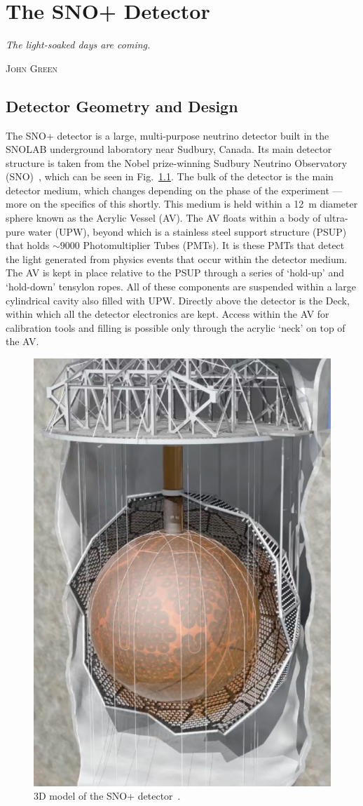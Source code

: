
\chapter{The SNO+ Detector}\label{chap:detector}
\epigraph{\textit{The light-soaked days are coming.}}{\textsc{John Green}}
\section{Detector Geometry and Design}
The SNO+ detector is a large, multi-purpose neutrino detector built in the SNOLAB underground laboratory near Sudbury, Canada. Its main detector structure is taken from the Nobel prize-winning Sudbury Neutrino Observatory (SNO)~\cite{}, %
which can be seen in Fig.~\ref{fig:snoplus_detector}. The bulk of the detector is the main detector medium, which changes depending on the phase of the experiment --- more on the specifics of this shortly. This medium is held within a \SI{12}{\metre} diameter sphere known as the Acrylic Vessel (AV). The AV floats within a body of ultra-pure water (UPW), beyond which is a stainless steel support structure (PSUP) that holds $\sim\num{9000}$ Photomultiplier Tubes (PMTs). It is these PMTs that detect the light generated from physics events that occur within the detector medium. The AV is kept in place relative to the PSUP through a series of `hold-up' and `hold-down' tensylon ropes. All of these components are suspended within a large cylindrical cavity also filled with UPW. Directly above the detector is the Deck, within which all the detector electronics are kept. Access within the AV for calibration tools and filling is possible only through the acrylic `neck' on top of the AV.

\begin{figure}
    \centering
    \includegraphics[width=0.48\linewidth]{2_Detector/Figs/detector_picture.png}
    \caption[3D model of the SNO+ detector]{3D model of the SNO+ detector~\cite{albaneseSNOExperiment2021}.}
    \label{fig:snoplus_detector}
\end{figure}

